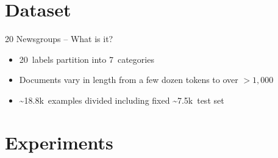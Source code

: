 \section{Dataset}
\begin{frame}{20 Newsgroups -- What is it?}
  \begin{itemize}
    \item 20~labels partition into 7~categories 
    \item Documents vary in length from a few dozen tokens to over ${{>}1,000}$
  \end{itemize}
  \vfill
   
  \begin{itemize}[<+->]
    \item \textasciitilde18.8k~examples divided including fixed \textasciitilde7.5k~test set
  \end{itemize}
  \vfill
  {
    \begin{center}
      \scriptsize
      \onslide<+->{}
    \end{center}
  }
\end{frame}

\section{Experiments}
